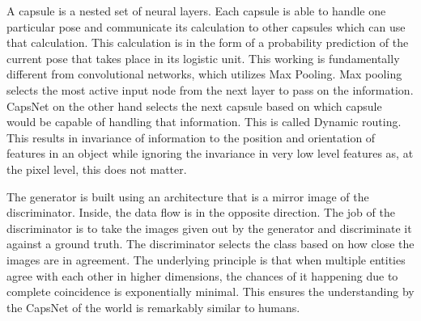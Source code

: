 A capsule is a nested set of neural layers. Each capsule is able to handle one particular pose and communicate its calculation to other capsules which can use that calculation. This calculation is in the form of a probability prediction of the current pose that takes place in its logistic unit. This working is fundamentally different from convolutional networks, which utilizes Max Pooling. Max pooling selects the most active input node from the next layer to pass on the information. CapsNet on the other hand selects the next capsule based on which capsule would be capable of handling that information. This is called Dynamic routing. This results in invariance of information to the position and orientation of features in an object while ignoring the invariance in very low level features as, at the pixel level, this does not matter.
\par\bigskip

The generator is built using an architecture that is a mirror image of the discriminator. Inside, the data flow is in the opposite direction. The job of the discriminator is to take the images given out by the generator and discriminate it against a ground truth. The discriminator selects the class based on how close the images are in agreement. The underlying principle is that when multiple entities agree with each other in higher dimensions, the chances of it happening due to complete coincidence is exponentially minimal. This ensures the understanding by the CapsNet of the world is remarkably similar to humans.

